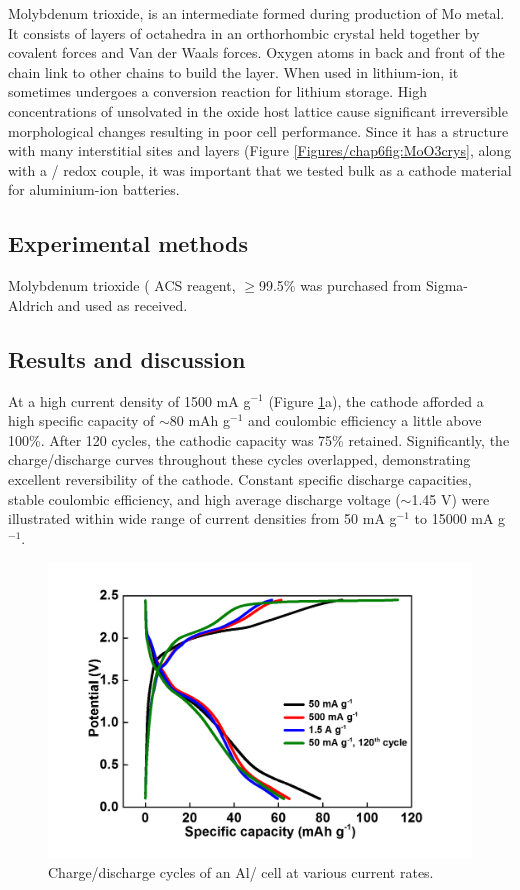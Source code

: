 Molybdenum trioxide,  is an intermediate formed during production of Mo metal. It consists of layers of  octahedra in an orthorhombic crystal held together by covalent forces and Van der Waals forces. Oxygen atoms in back and front of the chain link to other chains to build the layer. When used in lithium-ion, it sometimes undergoes a conversion reaction for lithium storage. High concentrations of unsolvated  in the oxide host lattice cause significant irreversible morphological changes resulting in poor cell performance.
Since it has a structure with many interstitial sites and layers (Figure \ref{Figures/chap6fig:MoO3crys}, along with a / redox couple, it was important that we tested bulk  as a cathode material for aluminium-ion batteries.


\subsection{Experimental methods}
Molybdenum trioxide ( ACS reagent, $\geq$99.5\% was purchased from Sigma-Aldrich and used as received.

\subsection{Results and discussion}
At a high current density of 1500 mA g$^{-1}$ (Figure \ref{Figures/chap6fig:MoO3CDC}a), the  cathode afforded a  high specific capacity of $\sim$80 mAh g$^{-1}$ and coulombic efficiency a little above 100\%. After 120 cycles, the cathodic capacity was 75\% retained. Significantly, the charge/discharge curves throughout these cycles overlapped, demonstrating excellent reversibility of the  cathode. Constant specific discharge capacities, stable coulombic efficiency, and high average discharge voltage ($\sim$1.45 V) were illustrated within wide range of current densities from 50 mA g$^{-1}$ to 15000 mA g$^{-1}$. 

\begin{figure}[th!]
\centering
\includegraphics[width=\textwidth]{Figures/chap6fig/MoO3CDCredo}
\caption{Charge/discharge cycles of an Al/ cell at various current rates.}
\label{Figures/chap6fig:MoO3CDC}
\end{figure}


